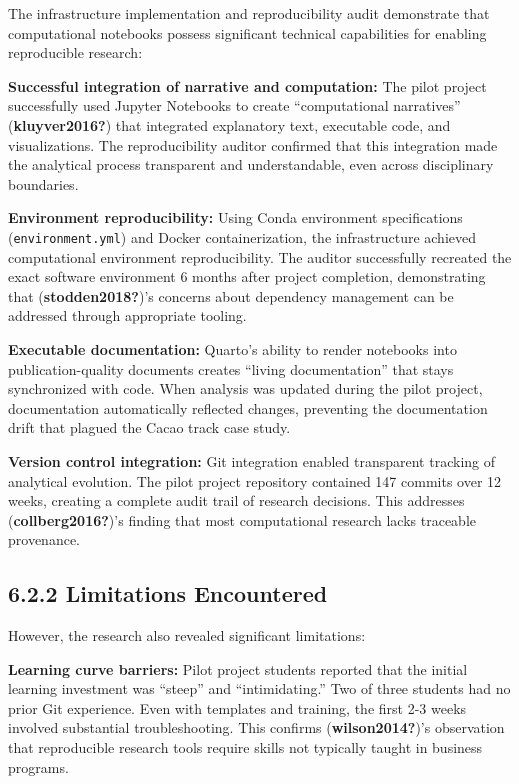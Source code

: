 \documentclass[
  oneside,
  open=any]{scrbook}
\begin{document}
The infrastructure implementation and reproducibility audit demonstrate
that computational notebooks possess significant technical capabilities
for enabling reproducible research:

\textbf{Successful integration of narrative and computation:} The pilot
project successfully used Jupyter Notebooks to create ``computational
narratives'' (\textbf{kluyver2016?}) that integrated explanatory text,
executable code, and visualizations. The reproducibility auditor
confirmed that this integration made the analytical process transparent
and understandable, even across disciplinary boundaries.

\textbf{Environment reproducibility:} Using Conda environment
specifications (\texttt{environment.yml}) and Docker containerization,
the infrastructure achieved computational environment reproducibility.
The auditor successfully recreated the exact software environment 6
months after project completion, demonstrating that
(\textbf{stodden2018?})'s concerns about dependency management can be
addressed through appropriate tooling.

\textbf{Executable documentation:} Quarto's ability to render notebooks
into publication-quality documents creates ``living documentation'' that
stays synchronized with code. When analysis was updated during the pilot
project, documentation automatically reflected changes, preventing the
documentation drift that plagued the Cacao track case study.

\textbf{Version control integration:} Git integration enabled
transparent tracking of analytical evolution. The pilot project
repository contained 147 commits over 12 weeks, creating a complete
audit trail of research decisions. This addresses
(\textbf{collberg2016?})'s finding that most computational research
lacks traceable provenance.

\subsection{6.2.2 Limitations
Encountered}\label{limitations-encountered}

However, the research also revealed significant limitations:

\textbf{Learning curve barriers:} Pilot project students reported that
the initial learning investment was ``steep'' and ``intimidating.'' Two
of three students had no prior Git experience. Even with templates and
training, the first 2-3 weeks involved substantial troubleshooting. This
confirms (\textbf{wilson2014?})'s observation that reproducible research
tools require skills not typically taught in business programs.
\end{document}
